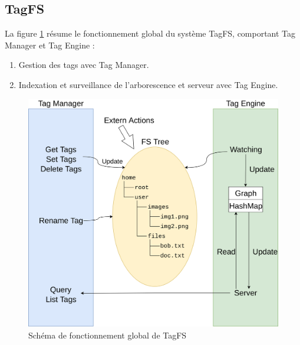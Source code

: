 \subsection{TagFS}
La figure \ref{tagfs_schema} résume le fonctionnement global du système TagFS, comportant Tag Manager et Tag Engine : 
\begin{enumerate}
    \item Gestion des tags avec Tag Manager.
    \item Indexation et surveillance de l'arborescence et serveur avec Tag Engine.
\end{enumerate}
\begin{figure}
    \begin{center}
        \includegraphics[width=1\textwidth]{images/tagfs.png}
    \end{center}
    \caption{Schéma de fonctionnement global de TagFS}
    \label{tagfs_schema}
\end{figure}
